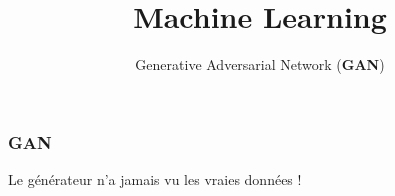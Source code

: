 \documentclass{formation}
\title{Machine Learning}
\subtitle{Generative Adversarial Network (\textbf{GAN})}
\begin{document}
\maketitle

\begin{frame}
  \frametitle{GAN}
  Le générateur n'a jamais vu les vraies données !
\end{frame}
\end{document}
